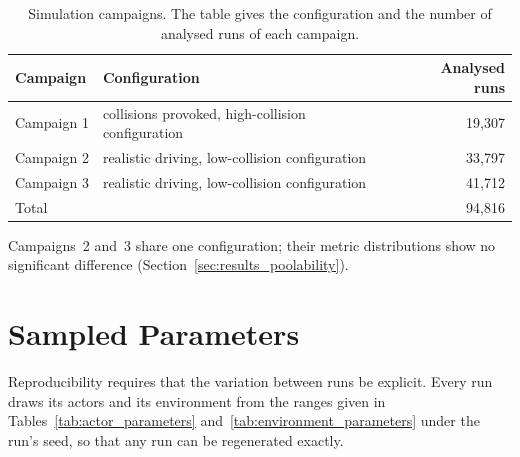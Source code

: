 \begin{table}[htbp]
    \centering
    \caption[Simulation campaigns]{Simulation campaigns. The table gives the configuration and the number of analysed runs of each campaign.}
    \label{tab:campaigns}
    \small
    \begin{tabular}{@{}llr@{}}
        \toprule
        {\bfseries Campaign} & {\bfseries Configuration} & {\bfseries Analysed runs} \\
        \midrule
        Campaign 1 & collisions provoked, high-collision configuration & 19,307 \\
        Campaign 2 & realistic driving, low-collision configuration & 33,797 \\
        Campaign 3 & realistic driving, low-collision configuration & 41,712 \\
        \midrule
        Total      &                                                 & 94,816 \\
        \bottomrule
    \end{tabular}
    \par\smallskip\footnotesize\raggedright Campaigns~2 and~3 share one configuration;
    their metric distributions show no significant difference (Section~\ref{sec:results_poolability}).
\end{table}

\section{Sampled Parameters}
\label{sec:exp_parameters}
\label{sec:exp_pipeline}

Reproducibility requires that the variation between runs be explicit. Every run
draws its actors and its environment from the ranges given in
Tables~\ref{tab:actor_parameters} and~\ref{tab:environment_parameters} under the
run's seed, so that any run can be regenerated exactly.

